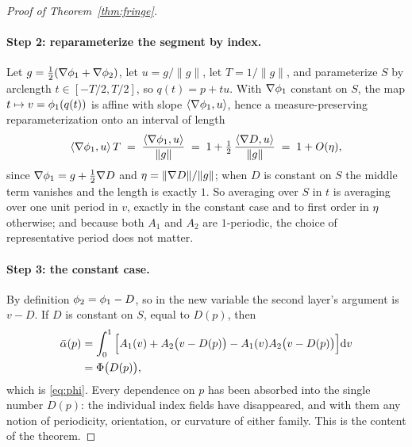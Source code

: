 \begin{proof}[Proof of Theorem~\ref{thm:fringe}]
\paragraph{Step 2: reparameterize the segment by index.}
Let $g=\tfrac12(\nabla\phi_1+\nabla\phi_2)$, let $u=g/\lVert g\rVert$, let
$T=1/\lVert g\rVert$, and parameterize $S$ by arclength $t\in[-T/2,T/2]$, so
$q(t)=p+tu$. With $\nabla\phi_1$ constant on $S$, the map $t\mapsto
v=\phi_1(q(t))$ is affine with slope $\langle\nabla\phi_1,u\rangle$, hence a
measure-preserving reparameterization onto an interval of length
\begin{equation}
  \langle\nabla\phi_1,u\rangle\,T
  \;=\;\frac{\langle\nabla\phi_1,u\rangle}{\lVert g\rVert}
  \;=\;1+\tfrac12\,\frac{\langle\nabla D,u\rangle}{\lVert g\rVert}
  \;=\;1+O(\eta),
\end{equation}
since $\nabla\phi_1=g+\tfrac12\nabla D$ and $\eta=\lVert\nabla D\rVert/\lVert
g\rVert$; when $D$ is constant on $S$ the middle term vanishes and the length is
exactly $1$. So averaging over $S$ in $t$ is averaging over one unit period in
$v$, exactly in the constant case and to first order in $\eta$ otherwise; and
because both $A_1$ and $A_2$ are $1$-periodic, the choice of representative
period does not matter.

\paragraph{Step 3: the constant case.}
By definition $\phi_2=\phi_1-D$, so in the new variable the second layer's
argument is $v-D$. If $D$ is constant on $S$, equal to $D(p)$, then
\begin{align}
  \bar\alpha(p)
  &=\int_0^1\Big[A_1(v)+A_2\big(v-D(p)\big)-A_1(v)A_2\big(v-D(p)\big)\Big]\mathrm{d}v
  \notag\\
  &=\Phi\big(D(p)\big),
\end{align}
which is \eqref{eq:phi}. Every dependence on $p$ has been absorbed into the single
number $D(p)$: the individual index fields have disappeared, and with them any
notion of periodicity, orientation, or curvature of either family. This is the
content of the theorem.


\end{proof}
